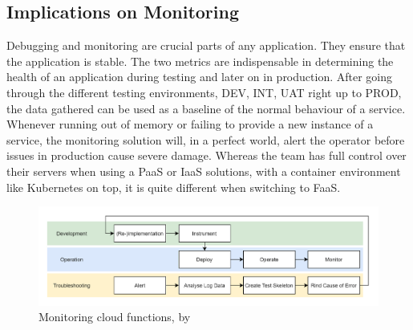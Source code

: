 \documentclass[a4paper,11pt, pagesize]{scrartcl}
\begin{document}
\begin{spacing}{1.2}
\subsection{Implications on Monitoring}
Debugging and monitoring are crucial parts of any application. They ensure that the application is stable. The two metrics are indispensable in determining the health of an application during testing and later on in production. After going through the different testing environments, DEV, INT, UAT right up to PROD, the data gathered can be used as a baseline of the normal behaviour of a service. Whenever running out of memory or failing to provide a new instance of a service, the monitoring solution will, in a perfect world, alert the operator before issues in production cause severe damage. Whereas the team has full control over their servers when using a PaaS or IaaS solutions, with a container environment like Kubernetes on top, it is quite different when switching to FaaS.
\begin{figure}[H]
\label{fig:manner}
\centering
\includegraphics[width=1\textwidth]{monitoring}
\caption{Monitoring cloud functions, by \cite{manner2019troubleshooting}}
\end{figure}

\end{spacing}
\end{document}

